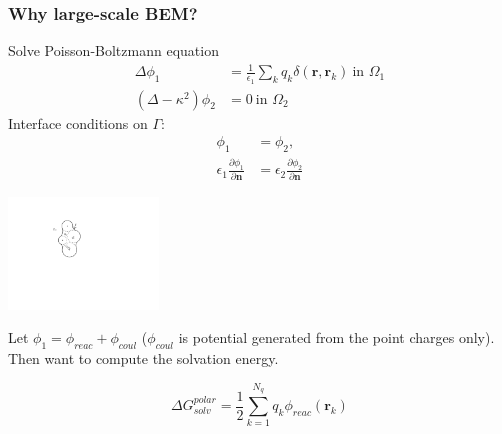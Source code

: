 \documentclass[dvipsnames,10pt]{beamer}
\begin{document}
%
%
%
%


\begin{frame}
\frametitle{Why large-scale BEM?}

    \vspace{.3cm}

    \begin{minipage}{5cm}
        Solve Poisson-Boltzmann equation
        \begin{align}
            \Delta\phi_1 &= \frac{1}{\epsilon_1}\sum_{k}q_k\delta(\mathbf{r}, \mathbf{r}_k)~\text{in }\Omega_1\nonumber\\
            (\Delta - \kappa^2)\phi_2 &= 0~\text{in }\Omega_2\nonumber
        \end{align}
        Interface conditions on $\Gamma$:
        \begin{align}
            \phi_1 &= \phi_2,\nonumber\\
            \epsilon_1\frac{\partial\phi_1}{\partial\mathbf{n}} &= \epsilon_2\frac{\partial\phi_2}{\partial \mathbf{n}}\nonumber
    \end{align}

    \end{minipage}
    \begin{minipage}{5cm}
        \includegraphics[width=4cm]{../figs/implicit_solvent.pdf}
    \end{minipage}
    Let $\phi_1 = \phi_{reac} + \phi_{coul}$ ($\phi_{coul}$ is potential generated from the point charges only). Then
    want to compute the solvation energy.
    \begin{tcolorbox}
        $$
        \Delta G_{solv}^{polar} = \frac{1}{2}\sum_{k=1}^{N_q}q_k\phi_{reac}(\mathbf{r}_k)
        $$
    \end{tcolorbox}


\end{frame}
\end{document}
